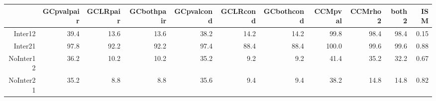 \begin{table}[ht]
\centering
\begin{tabular}{rrrrrrrrrrr}
  \hline
 & GCpvalpair & GCLRpair & GCbothpair & GCpvalcond & GCLRcond & GCbothcond & CCMpval & CCMrho2 & both2 & ISM \\ 
  \hline
Inter12 & 39.4 & 13.6 & 13.6 & 38.2 & 14.2 & 14.2 & 99.8 & 98.4 & 98.4 & 0.15 \\ 
  Inter21 & 97.8 & 92.2 & 92.2 & 97.4 & 88.4 & 88.4 & 100.0 & 99.6 & 99.6 & 0.88 \\ 
  NoInter12 & 36.2 & 10.2 & 10.2 & 35.2 & 9.2 & 9.2 & 41.4 & 35.2 & 32.2 & 0.67 \\ 
  NoInter21 & 35.2 & 8.8 & 8.8 & 35.6 & 9.4 & 9.4 & 38.2 & 14.8 & 14.8 & 0.82 \\ 
   \hline
\end{tabular}
\end{table}
